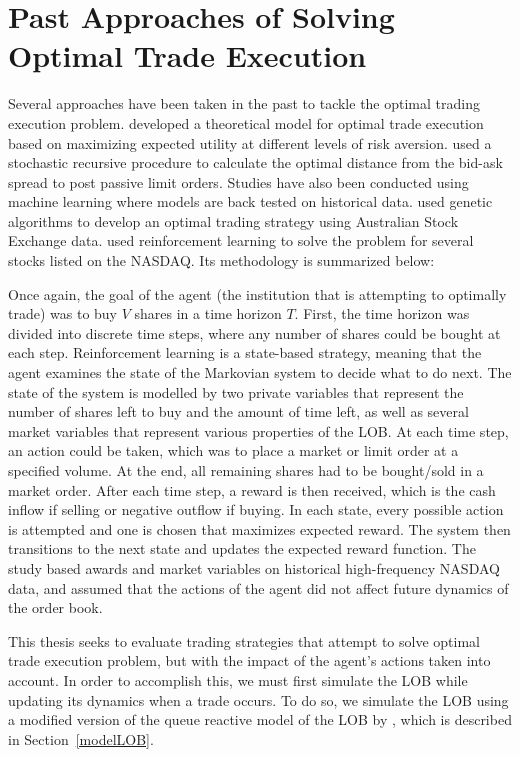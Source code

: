 \section{Past Approaches of Solving Optimal Trade Execution}
Several approaches have been taken in the past to tackle the optimal trading execution problem. \cite{A1} developed a theoretical model for optimal trade execution based on maximizing expected utility at different levels of risk aversion. \cite{A2} used a stochastic recursive procedure to calculate the optimal distance from the bid-ask spread to post passive limit orders. Studies have also been conducted using machine learning where models are back tested on historical data. \cite{A5} used genetic algorithms to develop an optimal trading strategy using Australian Stock Exchange data. \cite{A3} used reinforcement learning to solve the problem for several stocks listed on the NASDAQ. Its methodology is summarized below:


Once again, the goal of the agent (the institution that is attempting to optimally trade) was to buy $V$ shares in a time horizon $T$. First, the time horizon was divided into discrete time steps, where any number of shares could be bought at each step. Reinforcement learning is a state-based strategy, meaning that the agent examines the state of the Markovian system to decide what to do next. The state of the system is modelled by two private variables that represent the number of shares left to buy and the amount of time left, as well as several market variables that represent various properties of the LOB. At each time step, an action could be taken, which was to place a market or limit order at a specified volume. At the end, all remaining shares had to be bought/sold in a market order.  After each time step, a reward is then received, which is the cash inflow if selling or negative outflow if buying. In each state, every possible action is attempted and one is chosen that maximizes expected reward. The system then transitions to the next state and updates the expected reward function. The study based awards and market variables on historical high-frequency NASDAQ data, and assumed that the actions of the agent did not affect future dynamics of the order book. 


This thesis seeks to evaluate trading strategies that attempt to solve optimal trade execution problem, but with the impact of the agent’s actions taken into account. In order to accomplish this, we must first simulate the LOB while updating its dynamics when a trade occurs. To do so, we simulate the LOB using a modified version of the queue reactive model of the LOB by \cite{A6}, which is described in Section~\ref{modelLOB}.

